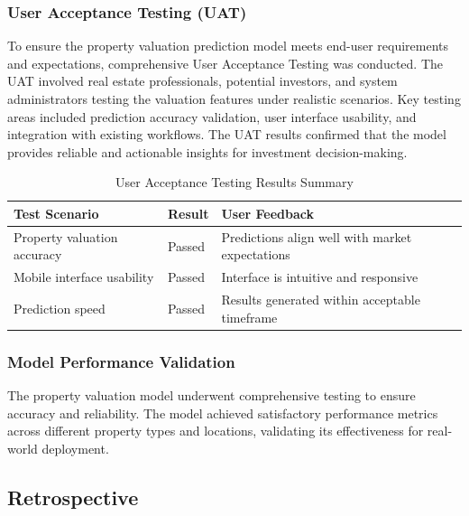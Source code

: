 \subsubsection{User Acceptance Testing (UAT)}
To ensure the property valuation prediction model meets end-user requirements and expectations, comprehensive User Acceptance Testing was conducted. The UAT involved real estate professionals, potential investors, and system administrators testing the valuation features under realistic scenarios. Key testing areas included prediction accuracy validation, user interface usability, and integration with existing workflows. The UAT results confirmed that the model provides reliable and actionable insights for investment decision-making.
\newpage
\begin{table}[htbp]
    \centering
    \begin{tabular}{|p{4cm}|p{3cm}|p{6cm}|}
        \hline
        \textbf{Test Scenario} & \textbf{Result} & \textbf{User Feedback} \\
        \hline
        Property valuation accuracy & Passed & Predictions align well with market expectations \\
        \hline
        Mobile interface usability & Passed & Interface is intuitive and responsive \\
        \hline
        Prediction speed & Passed & Results generated within acceptable timeframe \\
        \hline
    \end{tabular}
    \caption{User Acceptance Testing Results Summary}
    \label{tab:uat-results}
\end{table}

\subsubsection{Model Performance Validation}
The property valuation model underwent comprehensive testing to ensure accuracy and reliability. The model achieved satisfactory performance metrics across different property types and locations, validating its effectiveness for real-world deployment.

\subsection{Retrospective}


